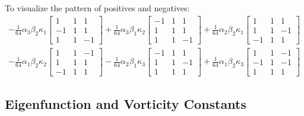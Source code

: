 \documentclass[12pt,onecolumn]{article}
\begin{document}
To visualize the pattern of positives and negatives:
\begin{equation}
\begin{split}
-\frac{1}{64} \alpha_3 \beta_2 \kappa_1 
\left[ \begin{array}{ccc}
1 & 1 & 1 \\
-1 & 1 & 1 \\
1 & 1 & -1 \end{array} \right] 
+ \frac{1}{64} \alpha_3 \beta_1 \kappa_2
\left[ \begin{array}{ccc}
-1 & 1 & 1 \\
1 & 1 & 1 \\
1 & 1 & -1 \end{array} \right] 
+\frac{1}{64} \alpha_2 \beta_2 \kappa_1 
\left[ \begin{array}{ccc}
1 & 1 & 1 \\
1 & 1 & -1 \\
-1 & 1 & 1 \end{array} \right] \\
- \frac{1}{64} \alpha_1 \beta_2 \kappa_2 
\left[ \begin{array}{ccc}
1 & 1 & -1 \\
1 & 1 & 1 \\
-1 & 1 & 1 \end{array} \right]
- \frac{1}{64} \alpha_2 \beta_1 \kappa_3 
\left[ \begin{array}{ccc}
-1 & 1 & 1 \\
1 & 1 & -1 \\
1 & 1 & 1 \end{array} \right]
+ \frac{1}{64} \alpha_1 \beta_2 \kappa_3 
\left[ \begin{array}{ccc}
1 & 1 & -1 \\
-1 & 1 & -1 \\
1 & 1 & 1 \end{array} \right]
\end{split}
\end{equation}

\subsection{Eigenfunction and Vorticity Constants}
\end{document}

